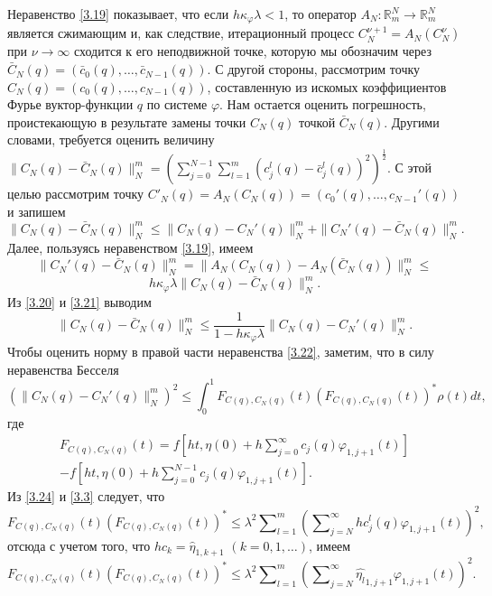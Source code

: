 Неравенство \eqref{3.19} показывает, что если $h\kappa_\varphi\lambda<1$, то оператор  $A_N:\mathbb{R}^N_m\to \mathbb{R}^N_m$ является сжимающим и, как следствие, итерационный процесс $C_N^{\nu+1}=A_N(C_N^{\nu})$  при $\nu\to\infty$ сходится к его неподвижной точке, которую мы обозначим через  $\bar C_N(q)=(\bar c_0(q),\ldots,\bar c_{N-1}(q))$. С другой стороны, рассмотрим точку $C_N(q)=(c_0(q),\ldots,c_{N-1}(q))$, составленную из искомых коэффициентов Фурье вуктор-функции $q$ по системе $\varphi$. Нам остается оценить погрешность, проистекающую в результате замены точки $C_N(q)$ точкой $\bar C_N(q)$. Другими словами, требуется оценить величину
$\|C_N(q)-\bar C_N(q)\|_N^m= \left(\sum_{j=0}^{N-1}\sum\nolimits_{l=1}^m(c_j^l(q)-\bar c_j^l(q))^2\right)^\frac12$. С этой целью рассмотрим точку $C'_N(q)=A_N(C_N(q))=(c_0'(q),\ldots,c_{N-1}'(q))$ и запишем
\begin{equation}\label{3.20}
\|C_N(q)-\bar C_N(q)\|_N^m\le \|C_N(q)- C_N'(q)\|_N^m+\|C_N'(q)-\bar C_N(q)\|_N^m.
\end{equation}
Далее, пользуясь неравенством \eqref{3.19}, имеем
$$
\|C_N'(q)-\bar C_N(q)\|_N^m=\|A_N(C_N(q))-A_N(\bar C_N(q))\|_N^m\le
$$
\begin{equation}\label{3.21}
h\kappa_\varphi\lambda\|C_N(q)-\bar C_N(q)\|_N^m.
\end{equation}
Из \eqref{3.20} и \eqref{3.21} выводим
\begin{equation}\label{3.22}
\|C_N(q)-\bar C_N(q)\|_N^m\le \frac1{1-h\kappa_\varphi\lambda}\|C_N(q)- C_N'(q)\|_N^m.
\end{equation}
Чтобы оценить норму в правой части неравенства \eqref{3.22}, заметим, что в силу неравенства Бесселя
\begin{equation}\label{3.23}
(\|C_N(q)- C_N'(q)\|_N^m)^2\le \int_{0}^1F_{C(q),C_N(q)}(t)(F_{C(q),C_N(q)}(t))^*\rho(t) dt,
\end{equation}
где
\begin{multline}\label{3.24}
 F_{C(q),C_N(q)}(t)=f\left[ht,\eta(0)+ h\sum\nolimits_{j=0}^\infty c_j(q)\varphi_{1,j+1}(t)\right] \\
  -f\left[ht,\eta(0)+ h\sum\nolimits_{j=0}^{N-1}c_j(q)\varphi_{1,j+1}(t)\right].
\end{multline}
Из \eqref{3.24} и \eqref{3.3} следует, что
$$
F_{C(q),C_N(q)}(t)(F_{C(q),C_N(q)}(t))^*\le \lambda^2 \sum\nolimits_{l=1}^m  \left(\sum\nolimits_{j=N}^\infty hc_j^l(q)\varphi_{1,j+1}(t)\right)^2,
$$
отсюда с учетом того, что $hc_k=\hat \eta_{1,k+1}$ $(k=0,1,\ldots)$, имеем
\begin{equation}\label{3.25}
F_{C(q),C_N(q)}(t)(F_{C(q),C_N(q)}(t))^*\le \lambda^2   \sum\nolimits_{l=1}^m \left(\sum\nolimits_{j=N}^\infty  \widehat {\eta_l}_{1,j+1}\varphi_{1,j+1}(t)\right)^2.
\end{equation}
